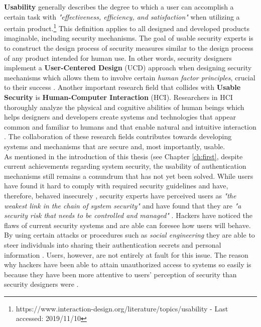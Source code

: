 \textbf{Usability} generally describes the degree to which a user can accomplish a certain task with \textit{"effectiveness, efficiency, and satisfaction"} when utilizing a certain product.\footnote{https://www.interaction-design.org/literature/topics/usability - Last accessed: 2019/11/10} This definition applies to all designed and developed products imaginable, including security mechanisms. The goal of usable security experts is to construct the design process of security measures similar to the design process of any product intended for human use. In other words, security designers implement a \textbf{User-Centered Design} (UCD) approach when designing security mechanisms which allows them to involve certain \textit{human factor principles}, crucial to their success \cite{Adams:1999:UE:322796.322806, sasse, Butz2014}. Another important research field that collides with \textbf{Usable Security} is \textbf{Human-Computer Interaction} (HCI). Researchers in HCI thoroughly analyze the physical and cognitive abilities of human beings which helps designers and developers create systems and technologies that appear common and familiar to humans and that enable natural and intuitive interaction \cite{Butz2014}. The collaboration of these research fields contributes towards developing systems and mechanisms that are secure and, most importantly, usable.\\ 

As mentioned in the introduction of this thesis (see Chapter \ref{ch:first}, despite current achievements regarding system security, the usability of authentication mechanisms still remains a conundrum that has not yet been solved. While users have found it hard to comply with required security guidelines and have, therefore, behaved insecurely \cite{Adams:1999:UE:322796.322806, sasse}, security experts have perceived users as \textit{"the weakest link in the chain of system security"} \cite{sasse} and have found that they are \textit{"a security risk that needs to be controlled and managed"}  \cite{Adams:1999:UE:322796.322806}. Hackers have noticed the flaws of current security systems and are able can foresee how users will behave. By using certain attacks or procedures such as  \textit{social engineering} they are able to steer individuals into sharing their authentication secrets and personal information \cite{Adams:1999:UE:322796.322806, sasse}. Users, however, are not entirely at fault for this issue. The reason why hackers have been able to attain unauthorized access to systems so easily is because  they have been more attentive to users' perception of security than security designers were \cite{Adams:1999:UE:322796.322806}. 

